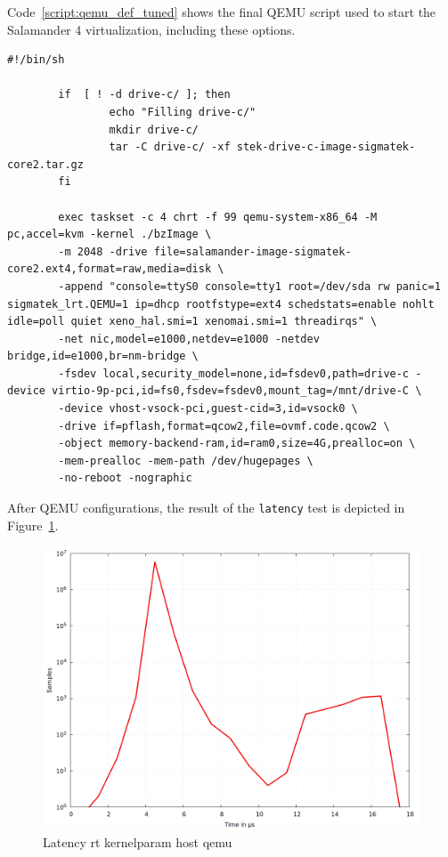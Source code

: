 \documentclass[MMR,Master,english]{twbook}
\begin{document}
\noindent Code~\ref{script:qemu_def_tuned} shows the final QEMU script used to start the Salamander 4 virtualization, including these options.

\clearpage

\begin{lstlisting}[name={Tuned QEMU script for starting Salamander 4 virtualization},label={script:qemu_def_tuned}]
		#!/bin/sh

		if  [ ! -d drive-c/ ]; then
				echo "Filling drive-c/"
				mkdir drive-c/
				tar -C drive-c/ -xf stek-drive-c-image-sigmatek-core2.tar.gz
		fi
			
		exec taskset -c 4 chrt -f 99 qemu-system-x86_64 -M pc,accel=kvm -kernel ./bzImage \
		-m 2048 -drive file=salamander-image-sigmatek-core2.ext4,format=raw,media=disk \
		-append "console=ttyS0 console=tty1 root=/dev/sda rw panic=1 sigmatek_lrt.QEMU=1 ip=dhcp rootfstype=ext4 schedstats=enable nohlt idle=poll quiet xeno_hal.smi=1 xenomai.smi=1 threadirqs" \
		-net nic,model=e1000,netdev=e1000 -netdev bridge,id=e1000,br=nm-bridge \
		-fsdev local,security_model=none,id=fsdev0,path=drive-c -device virtio-9p-pci,id=fs0,fsdev=fsdev0,mount_tag=/mnt/drive-C \
		-device vhost-vsock-pci,guest-cid=3,id=vsock0 \
		-drive if=pflash,format=qcow2,file=ovmf.code.qcow2 \
		-object memory-backend-ram,id=ram0,size=4G,prealloc=on \
		-mem-prealloc -mem-path /dev/hugepages \
		-no-reboot -nographic
	\end{lstlisting}
\vspace{2em}
\noindent After QEMU configurations, the result of the \texttt{latency} test is depicted in Figure~\ref{fig:max_latency_rt_kernelparam_host_qemu}.

\begin{figure}[H]
	\centering
	\includegraphics[width=0.7\columnwidth]{masterthesis-documentation/docs/sigmatek/xenomai/6rt_kernelparam_host_qemu/gnuplot_max_latency_rt_kernelparam_host_qemu.png}
	\caption[Latency rt kernelparam host qemu]{Latency rt kernelparam host qemu}
	\label{fig:max_latency_rt_kernelparam_host_qemu}
\end{figure}
\end{document}
